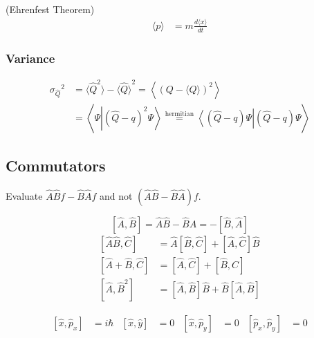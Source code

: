  (Ehrenfest Theorem)
\noindent\begin{align*}
    \langle p \rangle & = m \frac{d\langle x \rangle}{dt}
\end{align*}

\subsubsection{Variance}
\noindent\begin{align*}
    {\sigma_{\widehat{Q}}}^2 & = \langle {\widehat{Q}}^2 \rangle - {\langle \widehat{Q} \rangle }^2 =\left\langle{\left(Q-\langle Q\rangle\right)}^{2}\right\rangle                                                               \\
                             & =\left\langle\Psi\left|{\left(\widehat{Q}-q\right)}^{2}\Psi\right\rangle\stackrel{\text{hermitian}}{=}\left\langle\left(\widehat{Q}-q\right)\Psi\right|\left(\widehat{Q}-q\right)\Psi\right\rangle
\end{align*}


\subsection{Commutators}
Evaluate $\widehat{A}\widehat{B}f - \widehat{B}\widehat{A}f$ and not $(\widehat{A}\widehat{B} - \widehat{B}\widehat{A})f$.

\noindent\begin{equation*}
    \left[\widehat{A},\widehat{B}\right] = \widehat{A}\widehat{B} - \widehat{B}\widehat{A} = -\left[\widehat{B},\widehat{A}\right]
\end{equation*}
\noindent\begin{align*}
    \left[\widehat{A}\widehat{B},\widehat{C}\right]  & =\widehat{A}\left[\widehat{B},\widehat{C}\right]+\left[\widehat{A},\widehat{C}\right]\widehat{B}     \\
    \left[\widehat{A}+\widehat{B},\widehat{C}\right] & = \left[\widehat{A},\widehat{C}\right]+\left[\widehat{B},\widehat{C}\right]                          \\
    \left[\widehat{A},\widehat{B}^2\right]           & = \left[\widehat{A},\widehat{B}\right] \widehat{B} + \widehat{B}\left[\widehat{A},\widehat{B}\right]
\end{align*}


\noindent\begin{align*}
    \left[\widehat{x},\widehat{p}_x\right]  & = i\hbar & \left[\widehat{x}, \widehat{y}\right]     & = 0 &
    \left[\widehat{x}, \widehat{p}_y\right] & = 0      & \left[\widehat{p}_x, \widehat{p}_y\right] & = 0
\end{align*}

